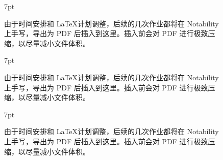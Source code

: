 \documentclass[UTF8]{report}
\theoremstyle{MyLineTheoremStyle} %
\theoremstyle{MyBlockTheoremStyle} %
\theoremstyle{MySubsubsectionStyle} %
\newenvironment{graybox}{%
        \def\FrameCommand{%
        \hspace{1pt}%
        {\color{gray}\small \vrule width 2pt}%
        {\color{graybox_color}\vrule width 4pt}%
        \colorbox{graybox_color}%
        }%
        \MakeFramed{\advance\hsize-\width\FrameRestore}%
        \noindent\hspace{-4.55pt}%
        \begin{adjustwidth}{}{7pt}%
        \vspace{2pt}\vspace{2pt}%
        }
        {%
        \vspace{2pt}\end{adjustwidth}\endMakeFramed%
        }
\begin{document}
\clearpage  %
\begin{figure}[b]\centering
    \begin{graybox}
    由于时间安排和 \LaTeX 计划调整，后续的几次作业都将在 Notability 上手写，导出为 PDF 后插入到这里。插入前会对 PDF 进行极致压缩，以尽量减小文件体积。
    \end{graybox}
\end{figure}
\begin{figure}[b]\centering
    \begin{graybox}
    由于时间安排和 \LaTeX 计划调整，后续的几次作业都将在 Notability 上手写，导出为 PDF 后插入到这里。插入前会对 PDF 进行极致压缩，以尽量减小文件体积。
    \end{graybox}
\end{figure}
\begin{figure}[b]\centering
    \begin{graybox}
    由于时间安排和 \LaTeX 计划调整，后续的几次作业都将在 Notability 上手写，导出为 PDF 后插入到这里。插入前会对 PDF 进行极致压缩，以尽量减小文件体积。
    \end{graybox}
\end{figure}
\clearpage


\end{document}
